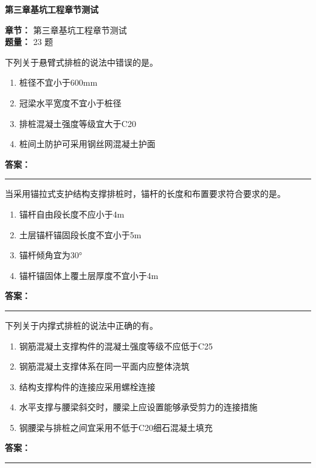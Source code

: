 \documentclass[UTF8,fontset=fandol,11pt]{ctexart}
\newcommand{\chaptertitle}[1]{\vspace{0.5em}\begin{tcolorbox}[enhanced,colback=deepblue,colframe=deepblue,arc=2mm,boxrule=0pt]\begin{center}\Large\bfseries\color{white}#1\end{center}\end{tcolorbox}\vspace{0.5em}}
\newcommand{\answerline}{\textcolor{answerred}{\rule{2.4cm}{0.7pt}}}
\begin{document}
\chaptertitle{第三章基坑工程章节测试}
\begin{mainbox}
\textbf{\textcolor{mainblue}{章节：}} 第三章基坑工程章节测试\\
\textbf{\textcolor{answerred}{题量：}} 23 题
\end{mainbox}

\begin{quizbox}[title={第 1 题}]
下列关于悬臂式排桩的说法中错误的是。\\
\begin{enumerate}[label=\Alph*.]
\item 桩径不宜小于600mm
\item 冠梁水平宽度不宜小于桩径
\item 排桩混凝土强度等级宜大于C20
\item 桩间土防护可采用钢丝网混凝土护面
\end{enumerate}
\textbf{\textcolor{answerred}{答案：}} \answerline
\end{quizbox}

\begin{quizbox}[title={第 2 题}]
当采用锚拉式支护结构支撑排桩时，锚杆的长度和布置要求符合要求的是。\\
\begin{enumerate}[label=\Alph*.]
\item 锚杆自由段长度不应小于4m
\item 土层锚杆锚固段长度不宜小于5m
\item 锚杆倾角宜为30°
\item 锚杆锚固体上覆土层厚度不宜小于4m
\end{enumerate}
\textbf{\textcolor{answerred}{答案：}} \answerline
\end{quizbox}

\begin{quizbox}[title={第 3 题}]
下列关于内撑式排桩的说法中正确的有。\\
\begin{enumerate}[label=\Alph*.]
\item 钢筋混凝土支撑构件的混凝土强度等级不应低于C25
\item 钢筋混凝土支撑体系在同一平面内应整体浇筑
\item 结构支撑构件的连接应采用螺栓连接
\item 水平支撑与腰梁斜交时，腰梁上应设置能够承受剪力的连接措施
\item 钢腰梁与排桩之间宜采用不低于C20细石混凝土填充
\end{enumerate}
\textbf{\textcolor{answerred}{答案：}} \answerline
\end{quizbox}
\end{document}
